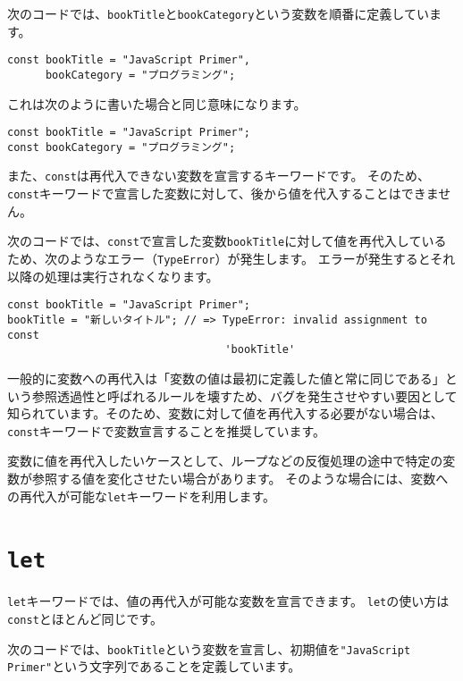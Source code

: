 次のコードでは、\texttt{bookTitle}と\texttt{bookCategory}という変数を順番に定義しています。

\begin{lstlisting}
const bookTitle = "JavaScript Primer",
      bookCategory = "プログラミング";
\end{lstlisting}

これは次のように書いた場合と同じ意味になります。

\begin{lstlisting}
const bookTitle = "JavaScript Primer";
const bookCategory = "プログラミング";
\end{lstlisting}

また、\texttt{const}は再代入できない変数を宣言するキーワードです。
そのため、\texttt{const}キーワードで宣言した変数に対して、後から値を代入することはできません。

次のコードでは、\texttt{const}で宣言した変数\texttt{bookTitle}に対して値を再代入しているため、次のようなエラー（\texttt{TypeError}）が発生します。
エラーが発生するとそれ以降の処理は実行されなくなります。

\begin{lstlisting}
const bookTitle = "JavaScript Primer";
bookTitle = "新しいタイトル"; // => TypeError: invalid assignment to const
                                  'bookTitle'
\end{lstlisting}

一般的に変数への再代入は「変数の値は最初に定義した値と常に同じである」という参照透過性と呼ばれるルールを壊すため、バグを発生させやすい要因として知られています。そのため、変数に対して値を再代入する必要がない場合は、\texttt{const}キーワードで変数宣言することを推奨しています。

変数に値を再代入したいケースとして、ループなどの反復処理の途中で特定の変数が参照する値を変化させたい場合があります。
そのような場合には、変数への再代入が可能な\texttt{let}キーワードを利用します。

\hypertarget{let}{%
\section[\texttt{let}]{\texttt{let}\,\protect{}}\label{let}}

\texttt{let}キーワードでは、値の再代入が可能な変数を宣言できます。
\texttt{let}の使い方は\texttt{const}とほとんど同じです。

次のコードでは、\texttt{bookTitle}という変数を宣言し、初期値を\texttt{"JavaScript Primer"}という文字列であることを定義しています。

